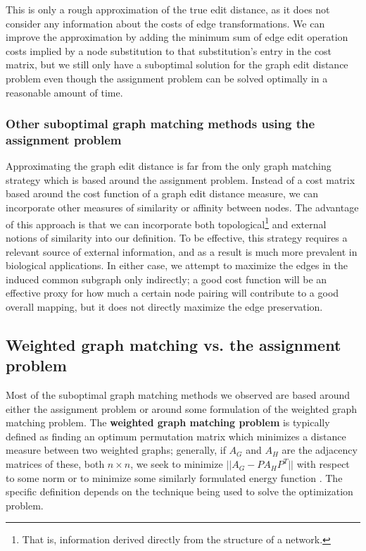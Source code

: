 \documentclass[12pt]{thesis}
\theoremstyle{plain}
\theoremstyle{definition}
\theoremstyle{remark}
\begin{document}
This is only a rough approximation of the true edit distance, as it does not consider any information about the costs of edge transformations. We can improve the approximation by adding the minimum sum of edge edit operation costs implied by a node substitution to that substitution's entry in the cost matrix, but we still only have a suboptimal solution for the graph edit distance problem even though the assignment problem can be solved optimally in a reasonable amount of time.

\subsubsection{Other suboptimal graph matching methods using the assignment problem}

Approximating the graph edit distance is far from the only graph matching strategy which is based around the assignment problem. Instead of a cost matrix based around the cost function of a graph edit distance measure, we can incorporate other measures of similarity or affinity between nodes. The advantage of this approach is that we can incorporate both topological\footnote{That is, information derived directly from the structure of a network.} and external notions of similarity into our definition. To be effective, this strategy requires a relevant source of external information, and as a result is much more prevalent in biological applications. In either case, we attempt to maximize the edges in the induced common subgraph only indirectly; a good cost function will be an effective proxy for how much a certain node pairing will contribute to a good overall mapping, but it does not directly maximize the edge preservation.

\subsection{Weighted graph matching vs. the assignment problem}

Most of the suboptimal graph matching methods we observed are based around either the assignment problem or around some formulation of the weighted graph matching problem. The \textbf{weighted graph matching problem} is typically defined as finding an optimum permutation matrix which minimizes a distance measure between two weighted graphs; generally, if $A_G$ and $A_H$ are the adjacency matrices of these, both $n\times n$, we seek to minimize $||A_G - PA_HP^T||$ with respect to some norm \cite{Umeyama_1988, Koutra_2013, Almohamad_1993} or to minimize some similarly formulated energy function \cite{Gold_1996}. The specific definition depends on the technique being used to solve the optimization problem.
\end{document}
